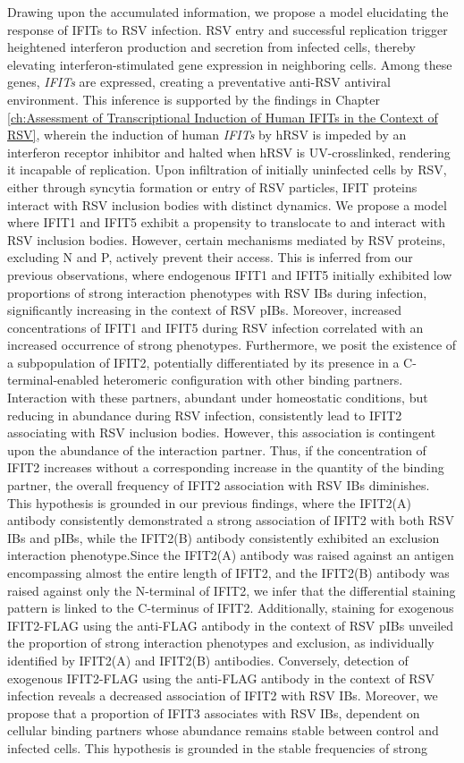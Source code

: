 Drawing upon the accumulated information, we propose a model elucidating the response of IFITs to RSV infection. RSV entry and successful replication trigger heightened interferon production and secretion from infected cells, thereby elevating interferon-stimulated gene expression in neighboring cells. Among these genes, \textit{IFITs} are expressed, creating a preventative anti-RSV antiviral environment. This inference is supported by the findings in Chapter \ref{ch:Assessment of Transcriptional Induction of Human IFITs in the Context of RSV}, wherein the induction of human \textit{IFITs} by hRSV is impeded by an interferon receptor inhibitor and halted when hRSV is UV-crosslinked, rendering it incapable of replication. Upon infiltration of initially uninfected cells by RSV, either through syncytia formation or entry of RSV particles, IFIT proteins interact with RSV inclusion bodies with distinct dynamics. We propose a model where IFIT1 and IFIT5 exhibit a propensity to translocate to and interact with RSV inclusion bodies. However, certain mechanisms mediated by RSV proteins, excluding N and P, actively prevent their access. This is inferred from our previous observations, where endogenous IFIT1 and IFIT5 initially exhibited low proportions of strong interaction phenotypes with RSV IBs during infection, significantly increasing in the context of RSV pIBs. Moreover, increased concentrations of IFIT1 and IFIT5 during RSV infection correlated with an increased occurrence of strong phenotypes. Furthermore, we posit the existence of a subpopulation of IFIT2, potentially differentiated by its presence in a C-terminal-enabled heteromeric configuration with other binding partners. Interaction with these partners, abundant under homeostatic conditions, but reducing in abundance during RSV infection, consistently lead to IFIT2 associating with RSV inclusion bodies. However, this association is contingent upon the abundance of the interaction partner. Thus, if the concentration of IFIT2 increases without a corresponding increase in the quantity of the binding partner, the overall frequency of IFIT2 association with RSV IBs diminishes. This hypothesis is grounded in our previous findings, where the IFIT2(A) antibody consistently demonstrated a strong association of IFIT2 with both RSV IBs and pIBs, while the IFIT2(B) antibody consistently exhibited an exclusion interaction phenotype.Since the IFIT2(A) antibody was raised against an antigen encompassing almost the entire length of IFIT2, and the IFIT2(B) antibody was raised against only the N-terminal of IFIT2, we infer that the differential staining pattern is linked to the C-terminus of IFIT2. Additionally, staining for exogenous IFIT2-FLAG using the anti-FLAG antibody in the context of RSV pIBs unveiled the proportion of strong interaction phenotypes and exclusion, as individually identified by IFIT2(A) and IFIT2(B) antibodies. Conversely, detection of exogenous IFIT2-FLAG using the anti-FLAG antibody in the context of RSV infection reveals a decreased association of IFIT2 with RSV IBs. Moreover, we propose that a proportion of IFIT3 associates with RSV IBs, dependent on cellular binding partners whose abundance remains stable between control and infected cells. This hypothesis is grounded in the stable frequencies of strong 